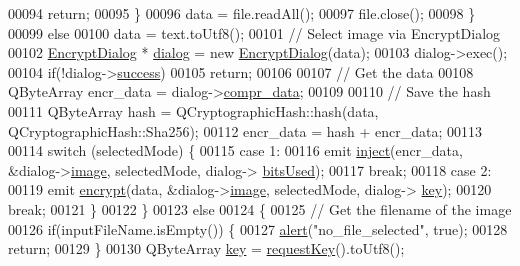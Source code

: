 \begin{DoxyCode}
00094                 \textcolor{keywordflow}{return};
00095             \}
00096             data = file.readAll();
00097             file.close();
00098         \}
00099         \textcolor{keywordflow}{else}
00100             data = text.toUtf8();
00101         \textcolor{comment}{// Select image via EncryptDialog}
00102         \hyperlink{class_encrypt_dialog}{EncryptDialog} * \hyperlink{class_view_p_c_a31abbb470fe329b44e6ffee202b903ca}{dialog} = \textcolor{keyword}{new} \hyperlink{class_encrypt_dialog}{EncryptDialog}(data);
00103         dialog->exec();
00104         \textcolor{keywordflow}{if}(!dialog->\hyperlink{class_encrypt_dialog_ada4900bcd40894d9c098c65aa4066ac9}{success})
00105             \textcolor{keywordflow}{return};
00106 
00107         \textcolor{comment}{// Get the data}
00108         QByteArray encr\_data = dialog->\hyperlink{class_encrypt_dialog_a3e8998aa39696cbd1242f6420ef18143}{compr\_data};
00109 
00110         \textcolor{comment}{// Save the hash}
00111         QByteArray hash = QCryptographicHash::hash(data, QCryptographicHash::Sha256);
00112         encr\_data = hash + encr\_data;
00113 
00114         \textcolor{keywordflow}{switch} (selectedMode) \{
00115         \textcolor{keywordflow}{case} 1:
00116             emit \hyperlink{class_view_p_c_a652c98014c2df32178d43a5a9612dd99}{inject}(encr\_data, &dialog->\hyperlink{class_encrypt_dialog_a739a0df1d28d06b28a3fd16e2bc16c73}{image}, selectedMode, dialog->
      \hyperlink{class_encrypt_dialog_abf638fea37fbdbaba215954e2e239860}{bitsUsed});
00117             \textcolor{keywordflow}{break};
00118         \textcolor{keywordflow}{case} 2:
00119             emit \hyperlink{class_view_p_c_a9d179ff85ed8b1ca0ff7fa495965b52d}{encrypt}(data, &dialog->\hyperlink{class_encrypt_dialog_a739a0df1d28d06b28a3fd16e2bc16c73}{image}, selectedMode, dialog->
      \hyperlink{class_encrypt_dialog_a1afdef3c665fb0d0fae06d1df8e84951}{key});
00120             \textcolor{keywordflow}{break};
00121         \}
00122     \}
00123     \textcolor{keywordflow}{else}
00124     \{
00125         \textcolor{comment}{// Get the filename of the image}
00126         \textcolor{keywordflow}{if}(inputFileName.isEmpty()) \{
00127             \hyperlink{class_view_p_c_a7c467169467789561078abc9d4fe57bd}{alert}(\textcolor{stringliteral}{"no\_file\_selected"}, \textcolor{keyword}{true});
00128             \textcolor{keywordflow}{return};
00129         \}
00130         QByteArray \hyperlink{namespace_errors_dict_setup_a09c268098d09ffb8e5504f30fa6d5dd9}{key} = \hyperlink{class_view_p_c_a559c95675ec98b15451f3bca47033d9c}{requestKey}().toUtf8();

\end{DoxyCode}

